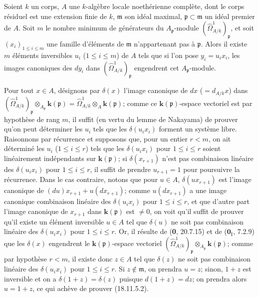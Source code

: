 \begin{lemma}[18.11.5.2]
\label{IV.18.11.5.2}
Soient $k$ un corps, $A$ une $k$-algèbre locale noethérienne complète, dont le corps résiduel est une extension finie de $k$, $\mathfrak m$ son idéal maximal, $\mathfrak p\subset\mathfrak m$ un idéal premier de $A$. Soit $m$ le nombre minimum de générateurs du $A_{\mathfrak p}$-module $(\hat{\Omega}^1_{A/k})_{\mathfrak p}$, et soit $(x_i)_{1\leq i\leq m}$ une famille d'éléments de $\mathfrak m$ n'appartenant pas à $\mathfrak p$. Alors il existe $m$ éléments inversibles $u_i$ \textup{(}$1\leq i\leq m$\textup{)} de $A$ tels que si l'on pose $y_i=u_ix_i$, les images canoniques des $dy_i$ dans $(\hat{\Omega}^1_{A/k})_{\mathfrak p}$ engendrent cet $A_{\mathfrak p}$-module.
\end{lemma}

Pour tout $x\in A$, désignons par $\delta(x)$ l'image canonique de $dx$ ($=d_{A/k}x$) dans $(\hat{\Omega}^1_{A/k})_{\mathfrak p}\otimes_{A_{\mathfrak p}}\boldsymbol{k}(\mathfrak p)=\hat{\Omega}^1_{A/k}\otimes_A\boldsymbol{k}(\mathfrak p)$; comme ce $\boldsymbol{k}(\mathfrak p)$-espace vectoriel est par hypothèse de rang $m$, il suffit (en vertu du lemme de Nakayama) de prouver qu'on peut déterminer les $u_i$ tels que les $\delta(u_ix_i)$ forment un système libre. Raisonnons par récurrence et supposons que, pour un entier $r<m$, on ait déterminé les $u_i$ ($1\leq i\leq r$) tels que les $\delta(u_ix_i)$ pour $1\leq i\leq r$ soient linéairement indépendants sur $\boldsymbol{k}(\mathfrak p)$; si $\delta(x_{r+1})$ n'est pas combinaison linéaire des $\delta(u_ix_i)$ pour $1\leq i\leq r$, il suffit de prendre $u_{r+1}=1$ pour poursuivre la récurrence. Dans le cas contraire, notons que pour $u\in A$, $\delta(ux_{r+1})$ est l'image canonique de $(du)x_{r+1}+u(dx_{r+1})$; comme $u(dx_{r+1})$ a une image canonique combinaison linéaire des $\delta(u_ix_i)$ pour $1\leq i\leq r$, et que d'autre part l'image canonique de $x_{r+1}$ dans $\boldsymbol{k}(\mathfrak p)$ est $\neq0$, on voit qu'il suffit de prouver qu'il existe un élément inversible $u\in A$ tel que $\delta(u)$ ne soit pas combinaison linéaire des $\delta(u_ix_i)$ pour $1\leq i\leq r$.
Or, il résulte de (\textbf{0}, 20.7.15) et de ($\mathbf{0}_{\mathrm I}$, 7.2.9) que les $\delta(x)$ engendrent le $\boldsymbol{k}(\mathfrak p)$-espace vectoriel $(\hat{\Omega}^1_{A/k})_{\mathfrak p}\otimes_{A_{\mathfrak p}}\boldsymbol{k}(\mathfrak p)$;
comme par hypothèse $r<m$, il existe donc $z\in A$ tel que $\delta(z)$ ne soit pas combinaison linéaire des $\delta(u_ix_i)$ pour $1\leq i\leq r$. Si $z\notin\mathfrak m$, on prendra $u=z$; sinon, $1+z$ est inversible et on a $\delta(1+z)=\delta(z)$ puisque $d(1+z)=dz$; on prendra alors $u=1+z$, ce qui achève de prouver (18.11.5.2).

